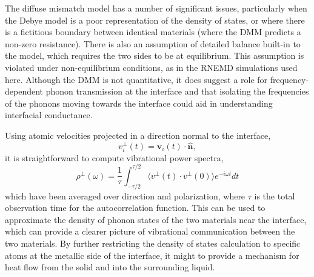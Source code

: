 The diffuse mismatch model has a number of significant issues,
particularly when the Debye model is a poor representation of the
density of states, or where there is a fictitious boundary between
identical materials (where the DMM predicts a non-zero
resistance).\cite{Monachon2016} There is also an assumption of
detailed balance built-in to the model,\cite{Chen2005} which requires
the two sides to be at equilibrium.  This assumption is violated under
non-equilibrium conditions, as in the RNEMD simulations used
here. Although the DMM is not quantitative, it does suggest a role for
frequency-dependent phonon transmission at the interface and 
that isolating the frequencies of the phonons moving
towards the interface could aid in understanding interfacial
conductance. 

Using atomic velocities projected in a direction normal to the
interface,
\begin{equation}
v^{\perp}_i(t) = \mathbf{v}_i(t) \cdot \hat{\mathbf{n}}, 
\end{equation}
it is straightforward to compute vibrational power spectra,
\begin{equation}
  \rho^\perp (\omega) = \frac{1}{\tau} \int_{-\tau/2}^{\tau/2} \langle v^{\perp}(t) \cdot v^{\perp}(0) \rangle e^{-i\omega t} dt
\label{eq:DOS}
\end{equation}
which have been averaged over direction and polarization, where $\tau$
is the total observation time for the autocorrelation function.  
This can be used to approximate the density of phonon states of the two
materials near the interface, which can provide a clearer picture of
vibrational communication between the two materials. 
By further restricting the density of states calculation to specific
atoms at the metallic side of the interface, it might to provide a
mechanism for heat flow from the solid and into the surrounding
liquid.

